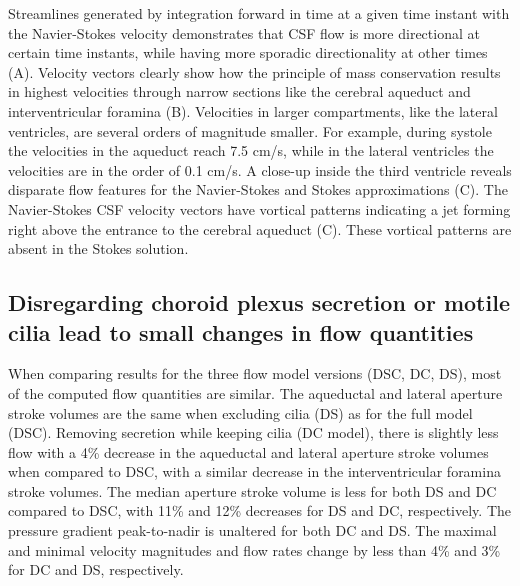 \documentclass{template}
\begin{document}
Streamlines generated by integration forward in time at a given time
instant with the Navier-Stokes velocity demonstrates that CSF flow is more directional at certain time
instants, while having more sporadic directionality at other times (A).
Velocity vectors clearly show how the principle of mass conservation results in highest velocities
through narrow sections like the cerebral aqueduct and interventricular foramina
(B).
Velocities in larger compartments, like the lateral ventricles, are several orders 
of magnitude smaller. For example, during systole the velocities in the aqueduct
reach 7.5 cm/s, while in the lateral ventricles the velocities are in the order of
0.1 cm/s. A close-up inside the third ventricle reveals disparate flow features for 
the Navier-Stokes and Stokes approximations (C).
The Navier-Stokes CSF velocity vectors have vortical patterns
indicating a jet forming right above the entrance to
the cerebral aqueduct (C).
These vortical patterns are absent in the Stokes solution.

\subsection{Disregarding choroid plexus secretion or motile cilia lead to small changes in flow quantities}
When comparing results for the three flow model versions (DSC, DC, DS), most of the computed flow quantities are similar.
The aqueductal and lateral aperture stroke volumes are the same when excluding cilia (DS) as for the full model (DSC).
Removing secretion while keeping cilia (DC model), there is slightly less flow with a 4\% decrease in the aqueductal
and lateral aperture stroke volumes when compared to DSC, with a similar decrease in the interventricular foramina stroke volumes.
The median aperture stroke volume is less for both DS and DC compared to DSC, with 11\% and 12\% decreases for DS and DC,
respectively. The pressure gradient peak-to-nadir is unaltered for both DC and DS.
The maximal and minimal velocity magnitudes and flow rates change
by less than 4\% and 3\% for DC and DS, respectively.
\end{document}
